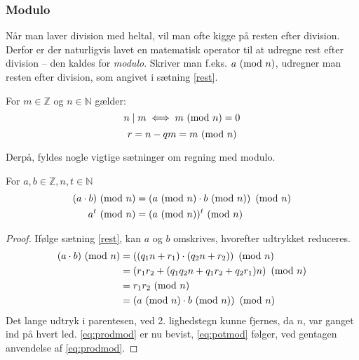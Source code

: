 \subsubsection{Modulo}
Når man laver division med heltal, vil man ofte kigge på resten efter division.
Derfor er der naturligvis lavet en matematisk operator til at udregne rest efter division -- den kaldes for \emph{modulo}.
Skriver man f.eks. \(a \ (\mathrm{mod}\ n)\), udregner man resten efter division, som angivet i sætning \ref{rest}.

\begin{definition}
    For \(m \in \mathbb{Z}\) og \(n \in \mathbb{N}\) gælder:
    \[n \mid m \iff m \ (\mathrm{mod}\ n) = 0\]
    \[r = n - q m = m \ (\mathrm{mod}\ n)\]%
\end{definition}

Derpå, fyldes nogle vigtige sætninger om regning med modulo.
\vfill
\begin{sent}
    \label{modmod}
    For \(a, b \in \mathbb{Z}, n, t \in \mathbb{N}\)
    \begin{align}
        (a \cdot b) \ (\mathrm{mod}\ n) &= \left(a \ (\mathrm{mod}\ n) \cdot b \ (\mathrm{mod}\ n)\right) \ (\mathrm{mod}\ n)\label{eq:prodmod}\\
        a^t \ (\mathrm{mod}\ n)         &= (a \ (\mathrm{mod}\ n))^t \ (\mathrm{mod}\ n)\label{eq:potmod}
    \end{align}
\end{sent}

\begin{proof}
    Ifølge sætning \ref{rest}, kan \(a\) og \(b\) omskrives, hvorefter udtrykket reduceres.
    \begin{align*}
(a \cdot b) \ (\mathrm{mod}\ n) &= \left((q_1 n + r_1) \cdot (q_2 n + r_2)\right) \ (\mathrm{mod}\ n)\\
                    &= \left( r_1 r_2 + (q_1 q_2 n + q_1 r_2 + q_2 r_1)n \right) \ (\mathrm{mod}\ n)\\
                    &= r_1 r_2 \ (\mathrm{mod}\ n)\\
                    &= \left(a \ (\mathrm{mod}\ n) \cdot b \ (\mathrm{mod}\ n)\right) \ (\mathrm{mod}\ n)
    \end{align*}
    Det lange udtryk i parentesen, ved 2. lighedstegn kunne fjernes, da \(n\), var ganget ind på hvert led.
    \eqref{eq:prodmod} er nu bevist, \eqref{eq:potmod} følger, ved gentagen anvendelse af \eqref{eq:prodmod}.
\end{proof}




